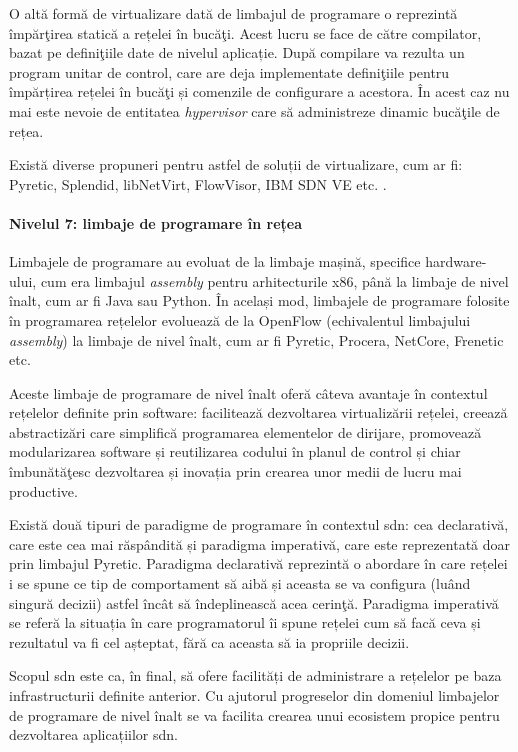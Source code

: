 O altă formă de virtualizare dată de limbajul de programare o reprezintă împărţirea statică a rețelei în bucăţi. Acest lucru se face de către compilator, bazat pe definiţiile date de nivelul aplicație. După compilare va rezulta un program unitar de control, care are deja implementate definiţiile pentru împărțirea rețelei în bucăţi și comenzile de configurare a acestora. În acest caz nu mai este nevoie de entitatea \textit{hypervisor} care să administreze dinamic bucăţile de rețea.

Există diverse propuneri pentru astfel de soluții de virtualizare, cum ar fi: Pyretic, Splendid, libNetVirt, FlowVisor, IBM SDN VE etc. \cite{reich2013modular, schlesinger2012splendid, turull2012libnetvirt, sherwood2009flowvisor}.

\paragraph{Nivelul 7: limbaje de programare în rețea}

Limbajele de programare au evoluat de la limbaje mașină, specifice hardware-ului, cum era limbajul \textit{assembly} pentru arhitecturile x86, până la limbaje de nivel înalt, cum ar fi Java sau Python. În același mod, limbajele de programare folosite în programarea rețelelor evoluează de la OpenFlow (echivalentul limbajului \textit{assembly}) la limbaje de nivel înalt, cum ar fi Pyretic, Procera, NetCore, Frenetic etc.

Aceste limbaje de programare de nivel înalt oferă câteva avantaje în contextul rețelelor definite prin software: facilitează dezvoltarea virtualizării rețelei, creează abstractizări care simplifică programarea elementelor de dirijare, promovează modularizarea software și reutilizarea codului în planul de control și chiar îmbunătăţesc dezvoltarea și inovația prin crearea unor medii de lucru mai productive.

Există două tipuri de paradigme de programare în contextul \gls{sdn}: cea declarativă, care este cea mai răspândită și paradigma imperativă, care este reprezentată doar prin limbajul Pyretic. Paradigma declarativă reprezintă o abordare în care rețelei i se spune ce tip de comportament să aibă și aceasta se va configura (luând singură decizii) astfel încât să îndeplinească acea cerinţă. Paradigma imperativă se referă la situația în care programatorul îi spune rețelei cum să facă ceva și rezultatul va fi cel așteptat, fără ca aceasta să ia propriile decizii.

Scopul \gls{sdn} este ca, în final, să ofere facilități de administrare a rețelelor pe baza infrastructurii definite anterior. Cu ajutorul progreselor din domeniul limbajelor de programare de nivel înalt se va facilita crearea unui ecosistem propice pentru dezvoltarea aplicațiilor \gls{sdn}.

